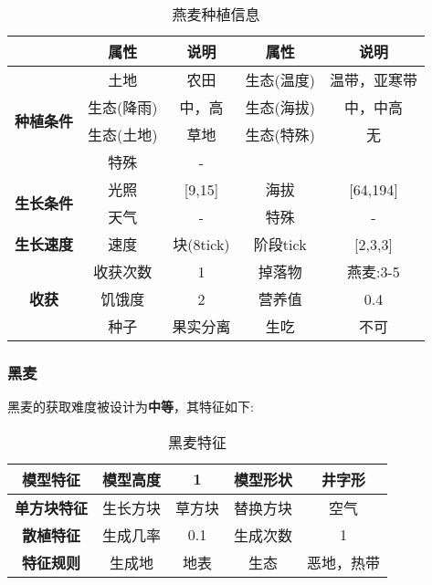 \begin{table}[H]
    \centering
    \caption{燕麦种植信息}
    \label{table:燕麦种植信息}
    \setlength{\tabcolsep}{4mm}
    \begin{tabular}{c|cc|cc}
        \toprule
                                           & \textbf{属性} & \textbf{说明}   & \textbf{属性} & \textbf{说明} \\
        \midrule
        \multirow{4}{*}{\textbf{种植条件}} & 土地          & 农田            & 生态(温度)    & 温带，亚寒带    \\
                                           & 生态(降雨)    & 中，高          & 生态(海拔)    & 中，中高       \\
                                           & 生态(土地)    & 草地            & 生态(特殊)    & 无            \\
                                           & 特殊          & -                                \\
        \midrule
        \multirow{2}{*}{\textbf{生长条件}} & 光照          & [9,15]         & 海拔          & [64,194]      \\
                                           & 天气          & -              & 特殊          & -      \\
        \midrule
        \textbf{生长速度}                  & 速度          & 块(8tick)       & 阶段tick      & [2,3,3]       \\
        \midrule
        \multirow{3}{*}{\textbf{收获}}     & 收获次数      & 1               & 掉落物        & 燕麦:3-5      \\
                                           & 饥饿度        & 2               & 营养值        & 0.4           \\
                                           & 种子          & 果实分离        & 生吃          & 不可          \\
        \bottomrule
    \end{tabular}
\end{table}

\subsubsection{黑麦}

黑麦的获取难度被设计为\textbf{中等}，其特征如下:
\begin{table}[H]
    \centering
    \caption{黑麦特征}
    \label{table:黑麦特征}
    \setlength{\tabcolsep}{4mm}
    \begin{tabular}{c|cc|cc}
        \toprule
        \textbf{模型特征}                  & 模型高度 & 1      & 模型形状 & 井字形 \\
        \midrule
        \textbf{单方块特征}                & 生长方块 & 草方块 & 替换方块 & 空气   \\
        \midrule
        \textbf{散植特征}                  & 生成几率 & 0.1    & 生成次数 & 1      \\
        \midrule
        \multirow{1}{*}{\textbf{特征规则}} & 生成地   & 地表   & 生态     & 恶地，热带   \\
        \bottomrule
    \end{tabular}
\end{table}


